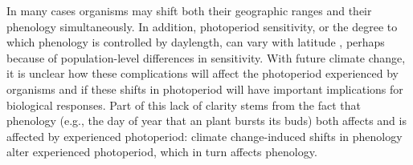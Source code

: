 \documentclass{article}
\begin{document}
\par In many cases organisms may shift both their geographic ranges and their phenology simultaneously. In addition, photoperiod sensitivity, or the degree to which phenology is controlled by daylength, can vary with latitude \citep{Howe:1996,saikkonen2012,Partanen:2005aa,Vihera-Aarnio:2006aa,Caffarra:2011b,gauzere2017}, perhaps because of population-level differences in sensitivity. With future climate change, it is unclear how these complications will affect the photoperiod experienced by organisms and if these shifts in photoperiod will have important implications for biological responses. Part of this lack of clarity stems from the fact that phenology (e.g., the day of year that an plant bursts its buds) both affects and is affected by experienced photoperiod: climate change-induced shifts in phenology alter experienced photoperiod, which in turn affects phenology.
\end{document}
